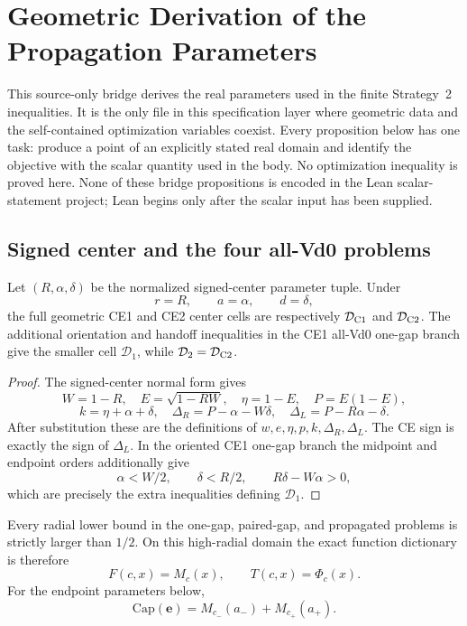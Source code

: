 \section{Geometric Derivation of the Propagation Parameters}
\label{sec:strategy2-parameter-bridges}

This source-only bridge derives the real parameters used in the finite
Strategy~2 inequalities.  It is the only file in this specification layer
where geometric data and the self-contained optimization variables coexist.
Every proposition below has one task: produce a point of an explicitly stated
real domain and identify the objective with the scalar quantity used in the
body.  No optimization inequality is proved here.  None of these bridge
propositions is encoded in the Lean scalar-statement project; Lean begins only after
the scalar input has been supplied.

\subsection{Signed center and the four all-Vd0 problems}

\begin{proposition}
\label{prop:s2-domain-bridge}
Let \((R,\alpha,\delta)\) be the normalized signed-center parameter tuple.  Under
\[
 r=R,\qquad a=\alpha,\qquad d=\delta,
\]
the full geometric CE1 and CE2 center cells are respectively
\(\mathcal D_{\rm C1}\) and \(\mathcal D_{\rm C2}\).  The additional
orientation and handoff inequalities in the CE1 all-Vd0 one-gap branch give
the smaller cell \(\mathcal D_1\), while
\(\mathcal D_2=\mathcal D_{\rm C2}\).
\end{proposition}

\begin{proof}
The signed-center normal form gives
\[
 W=1-R,\quad E=\sqrt{1-RW},\quad
 \eta=1-E,\quad P=E(1-E),
\]
\[
 k=\eta+\alpha+\delta,\quad
 \Delta_R=P-\alpha-W\delta,\quad
 \Delta_L=P-R\alpha-\delta.
\]
After substitution these are the definitions of
\(w,e,\eta,p,k,\Delta_R,\Delta_L\).  The CE sign is exactly the sign of
\(\Delta_L\).  In the oriented CE1 one-gap branch the midpoint and endpoint
orders additionally give
\[
 \alpha<W/2,\qquad \delta<R/2,\qquad
 R\delta-W\alpha>0,
\]
which are precisely the extra inequalities defining \(\mathcal D_1\).
\end{proof}

Every radial lower bound in the one-gap, paired-gap, and propagated
problems is strictly larger than $1/2$.  On this high-radial domain the exact
function dictionary is therefore
\[
 F(c,x)=M_c(x),
 \qquad
 T(c,x)=\Phi_c(x).
\]
For the endpoint parameters below,
\[
 \mathrm{Cap}(\mathbf e)
 =M_{c_-}(a_-)+M_{c_+}(a_+).
\]

